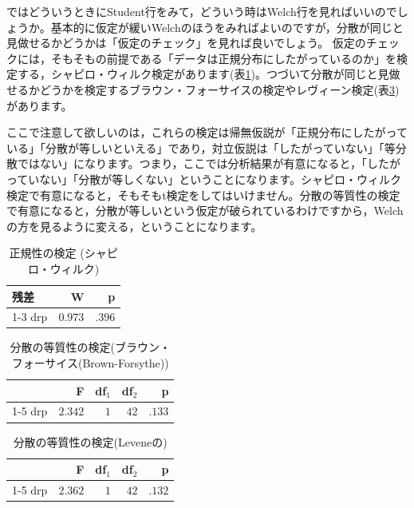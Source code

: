 \documentclass{ltjbook}
\begin{document}
ではどういうときにStudent行をみて，どういう時はWelch行を見ればいいのでしょうか。基本的に仮定が緩いWelchのほうをみればよいのですが，分散が同じと見做せるかどうかは「仮定のチェック」を見れば良いでしょう。
仮定のチェックには，そもそもの前提である「データは正規分布にしたがっているのか」を検定する，シャピロ・ウィルク検定があります(表\ref{tbl:28_02})。つづいて分散が同じと見做せるかどうかを検定するブラウン・フォーサイスの検定やレヴィーン検定(表\ref{tbl:28_04})があります。

ここで注意して欲しいのは，これらの検定は帰無仮説が「正規分布にしたがっている」「分散が等しいといえる」であり，対立仮説は「したがっていない」「等分散ではない」になります。つまり，ここでは分析結果が有意になると，「したがっていない」「分散が等しくない」ということになります。シャピロ・ウィルク検定で有意になると，そもそもt検定をしてはいけません。分散の等質性の検定で有意になると，分散が等しいという仮定が破られているわけですから，Welchの方を見るように変える，ということになります。

\begin{table}[h]
	\centering
	\caption{正規性の検定 (シャピロ・ウィルク)}
	\label{tbl:28_02}
	{
		\begin{tabular}{lrr}
			\toprule
			残差 & W & p  \\
			\cmidrule[0.4pt]{1-3}
			drp & $0.973$ & $.396$  \\
			\bottomrule
		\end{tabular}
	}
\end{table}




\begin{table}[h]
	\centering
	\caption{分散の等質性の検定(ブラウン・フォーサイス(Brown-Forsythe))}
	\label{tbl:28_03}
	{
		\begin{tabular}{lrrrr}
			\toprule
			 & F & df$_{1}$ & df$_{2}$ & p  \\
			\cmidrule[0.4pt]{1-5}
			drp & $2.342$ & $1$ & $42$ & $.133$  \\
			\bottomrule
		\end{tabular}
	}
\end{table}

\begin{table}[h]
	\centering
	\caption{分散の等質性の検定(Leveneの)}
	\label{tbl:28_04}
	{
		\begin{tabular}{lrrrr}
			\toprule
			 & F & df$_{1}$ & df$_{2}$ & p  \\
			\cmidrule[0.4pt]{1-5}
			drp & $2.362$ & $1$ & $42$ & $.132$  \\
			\bottomrule
		\end{tabular}
	}
\end{table}
\end{document}
